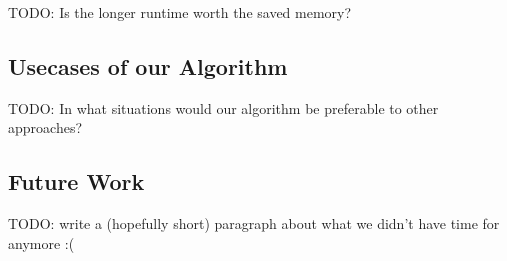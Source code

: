 \documentclass[12pt,a4paper,twoside]{scrartcl}
\numberwithin{equation}{section}
\begin{document}
TODO: Is the longer runtime worth the saved memory?

\subsection{Usecases of our Algorithm}

TODO: In what situations would our algorithm be preferable to other approaches?

\subsection{Future Work}

TODO: write a (hopefully short) paragraph about what we didn't have time for anymore :(


\clearpage




\end{document}
